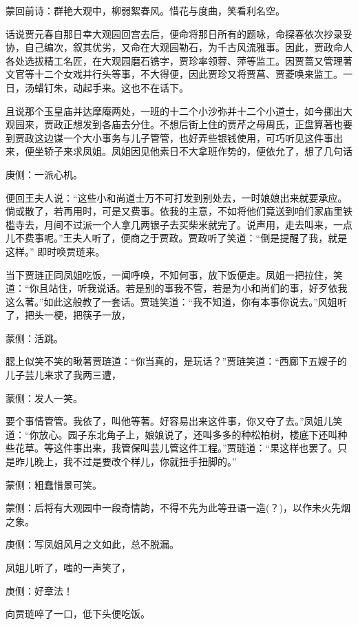 
\begin{parag}
    \begin{note}蒙回前诗：群艳大观中，柳弱絮春风。惜花与度曲，笑看利名空。\end{note}
\end{parag}


\begin{parag}
    话说贾元春自那日幸大观园回宫去后，便命将那日所有的题咏，命探春依次抄录妥协，自己编次，叙其优劣，又命在大观园勒石，为千古风流雅事。因此，贾政命人各处选拔精工名匠，在大观园磨石镌字，贾珍率领蓉、萍等监工。因贾蔷又管理著文官等十二个女戏并行头等事，不大得便，因此贾珍又将贾菖、贾菱唤来监工。一日，汤蜡钉朱，动起手来。这也不在话下。
\end{parag}


\begin{parag}
    且说那个玉皇庙并达摩庵两处，一班的十二个小沙弥并十二个小道士，如今挪出大观园来，贾政正想发到各庙去分住。不想后街上住的贾芹之母周氏，正盘算著也要到贾政这边谋一个大小事务与儿子管管，也好弄些银钱使用，可巧听见这件事出来，便坐轿子来求凤姐。凤姐因见他素日不大拿班作势的，便依允了，想了几句话\begin{note}庚侧：一派心机。\end{note}便回王夫人说：“这些小和尚道士万不可打发到别处去，一时娘娘出来就要承应。倘或散了，若再用时，可是又费事。依我的主意，不如将他们竟送到咱们家庙里铁槛寺去，月间不过派一个人拿几两银子去买柴米就完了。说声用，走去叫来，一点儿不费事呢。”王夫人听了，便商之于贾政。贾政听了笑道：“倒是提醒了我，就是这样。” 即时唤贾琏来。
\end{parag}


\begin{parag}
    当下贾琏正同凤姐吃饭，一闻呼唤，不知何事，放下饭便走。凤姐一把拉住，笑道：“你且站住，听我说话。若是别的事我不管，若是为小和尚们的事，好歹依我这么著。”如此这般教了一套话。贾琏笑道：“我不知道，你有本事你说去。”风姐听了，把头一梗，把筷子一放，\begin{note}蒙侧：活跳。\end{note}腮上似笑不笑的瞅著贾琏道：“你当真的，是玩话？”贾琏笑道：“西廊下五嫂子的儿子芸儿来求了我两三遭，\begin{note}蒙侧：发人一笑。\end{note}要个事情管管。我依了，叫他等著。好容易出来这件事，你又夺了去。”凤姐儿笑道：“你放心。园子东北角子上，娘娘说了，还叫多多的种松柏树，楼底下还叫种些花草。等这件事出来，我管保叫芸儿管这件工程。”贾琏道：“果这样也罢了。只是昨儿晚上，我不过是要改个样儿，你就扭手扭脚的。”\begin{note}蒙侧：粗蠢惜景可笑。\end{note}\begin{note}蒙侧：后将有大观园中一段奇情韵，不得不先为此等丑语一造(？)，以作未火先烟之象。\end{note}\begin{note}庚侧：写凤姐风月之文如此，总不脱漏。\end{note}凤姐儿听了，嗤的一声笑了，\begin{note}庚侧：好章法！\end{note}向贾琏啐了一口，低下头便吃饭。
\end{parag}


